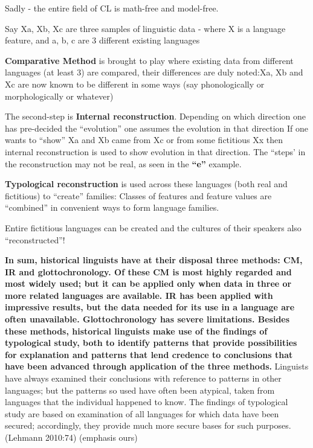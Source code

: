 Sadly - the entire field of CL is math-free and model-free.

Say Xa, Xb, Xc are three samples of linguistic data - where X is a language feature, and a, b, c are 3 different existing languages

\newpage

\textbf{Comparative Method} is brought to play where existing data from different languages (at least 3) are compared, their differences are duly noted:Xa, Xb and Xc are now known to be different in some ways (say phonologically or morphologically or whatever)

The second-step is \textbf{Internal reconstruction}. Depending on which direction one has pre-decided the “evolution” one assumes the evolution in that direction If one wants to “show” Xa and Xb came from Xc or from some fictitious Xx then internal reconstruction is used to show evolution in that direction. The “steps’ in the reconstruction may not be real, as seen in the \textbf{“e”} example.

\textbf{Typological reconstruction} is used across these languages (both real and fictitious) to “create” families: Classes of features and feature values are “combined” in convenient ways to form language families.

Entire fictitious languages can be created and the cultures of their speakers also “reconstructed”!

\begin{myquote}
\textbf{In sum, historical linguists have at their disposal three methods: CM, IR and glottochronology. Of these CM is most highly regarded and most widely used; but it can be applied only when data in three or more related languages are available. IR has been applied with impressive results, but the data needed for its use in a language are often unavailable. Glottochronology has severe limitations. Besides these methods, historical linguists make use of the findings of typological study, both to identify patterns that provide possibilities for explanation and patterns that lend credence to conclusions that have been advanced through application of the three methods.} Linguists have always examined their conclusions with reference to patterns in other languages; but the patterns so used have often been atypical, taken from languages that the individual happened to know. The findings of typological study are based on examination of all languages for which data have been secured; accordingly, they provide much more secure bases for such purposes. (Lehmann 2010:74) (emphasis ours)
\end{myquote}

